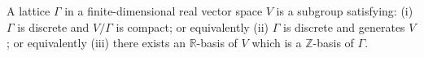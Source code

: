 A lattice $\Gamma$ in a finite-dimensional real vector space $V$ is a subgroup satisfying: (i) $\Gamma$ is discrete and $V/\Gamma$ is compact; or equivalently (ii) $\Gamma$ is discrete and generates $V$; or equivalently (iii) there exists an $\mathbb{R}$-basis of $V$ which is a $\mathbb{Z}$-basis of $\Gamma$.
